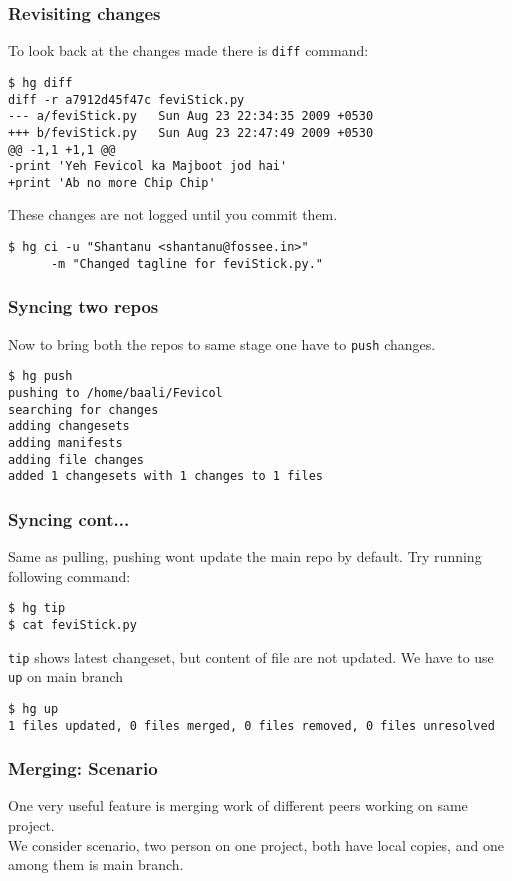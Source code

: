 \documentclass[14pt,compress]{beamer}
\newcommand{\typ}[1]{\lstinline{#1}}
\begin{document}
\begin{frame}[fragile]
  \frametitle{Revisiting changes}
To look back at the changes made there is \typ{diff} command:
\begin{lstlisting}
$ hg diff
diff -r a7912d45f47c feviStick.py
--- a/feviStick.py   Sun Aug 23 22:34:35 2009 +0530
+++ b/feviStick.py   Sun Aug 23 22:47:49 2009 +0530
@@ -1,1 +1,1 @@
-print 'Yeh Fevicol ka Majboot jod hai'
+print 'Ab no more Chip Chip'
  \end{lstlisting} %
  These changes are not logged until you commit them.\\
  \begin{lstlisting}
$ hg ci -u "Shantanu <shantanu@fossee.in>" 
      -m "Changed tagline for feviStick.py."
  \end{lstlisting} %
\end{frame}

\begin{frame}[fragile]
  \frametitle{Syncing two repos}
  Now to bring both the repos to same stage one have to \typ{push} changes.
  \begin{lstlisting}
$ hg push 
pushing to /home/baali/Fevicol
searching for changes
adding changesets
adding manifests
adding file changes
added 1 changesets with 1 changes to 1 files
  \end{lstlisting} %
\end{frame}


\begin{frame}[fragile]
  \frametitle{Syncing cont...}
  Same as pulling, pushing wont update the main repo by default. Try running following command:
  \begin{lstlisting}
$ hg tip    
$ cat feviStick.py
  \end{lstlisting}
  \typ{tip} shows latest changeset, but content of file are not updated. We have to use \typ{up} on main branch
  \begin{lstlisting}
$ hg up
1 files updated, 0 files merged, 0 files removed, 0 files unresolved    
  \end{lstlisting} %
\end{frame}

\begin{frame}[fragile]
  \frametitle{Merging: Scenario}
  One very useful feature is merging work of different peers working on same project.\\
  We consider scenario, two person on one project, both have local copies, and one among them is main branch.
\end{frame}
\end{document}
